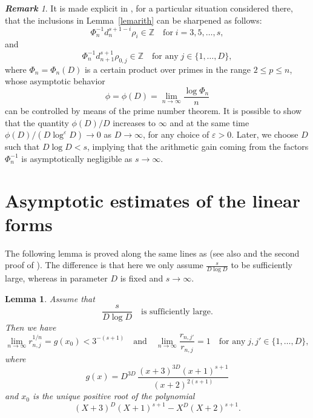 \documentclass{article}
\numberwithin{equation}{section}
\newtheorem{Lem}{Lemma}
\theoremstyle{remark}
\newtheorem{Rem}{\bf Remark}
\newcommand{\Z}{\mathbb{Z}}
\begin{document}
\begin{Rem} \label{remarith}
It is made explicit in \cite{RZnote}, for a particular situation considered there, that the inclusions in Lemma~\ref{lemarith} can be sharpened as follows:
$$\Phi_n^{-1}d_n^{s+1-i} \rho_i \in\Z \quad\mbox{for}\; i = 3, 5, \ldots, s,$$
and
$$\Phi_n^{-1}d_{n+1}^{s+1} \rho_{0,j} \in\Z \quad\mbox{for any}\; j\in \{1,\ldots,D\}, $$
where $\Phi_n=\Phi_n(D)$ is a certain product over primes in the range $2\le p\le n$, whose asymptotic behavior
$$
\phi=\phi(D)=\lim_{n\to\infty}\frac{\log\Phi_n}n
$$
can be controlled by means of the prime number theorem. It is possible to show that the quantity $\phi(D)/D$ increases to $\infty$ and at the same time $\phi(D)/(D\log^\varepsilon D)\to0$ as $D\to\infty$, for any choice of $\varepsilon>0$.
Later, we choose $D$ such that $ D\log D <s $, implying that the arithmetic gain coming from the factors $\Phi_n^{-1}$ is asymptotically negligible as $s\to\infty$.
\end{Rem}


\section{Asymptotic estimates of the linear forms}\label{sec4}


The following lemma is proved along the same lines as \cite[Lemma~2.1]{Sprang} (see also \cite[Lemma~4]{Zudilintrick} and the second proof of \cite[Lemme 3]{BR}). The  difference is that here we only assume $\frac{s}{  D\log D} $ to be sufficiently large, whereas in \cite{Sprang} parameter $D$ is fixed and $ s\to\infty$. 

\begin{Lem} \label{lemasy}
Assume that 
\begin{equation} \label{eqhyp}
\frac{s}{  D\log D} \quad\mbox{is sufficiently large.} 
\end{equation}
Then we have
\begin{equation} \label{eqasyun}
\lim_{n\to\infty} r_{n,j}^{1/n} = g(x_0) <3^{-(s+1)} \quad\mbox{and}\quad \lim_{n\to\infty} \frac{r_{n,j'}}{r_{n,j}} = 1
\quad\mbox{for any}\; j,j'\in\{1,\ldots,D\},
\end{equation}
where
$$g(x) = D^{ 3D } \, \frac{ (x+3)^{3D} (x+1)^{ s+1 }}{ ( x+2)^{2(s+1)}}$$
and $x_0$ is the unique positive root of the polynomial 
$$(X+3)^D(X+1)^{s+1} - X^D (X+2)^{s+1}.$$ 
\end{Lem}

\bigskip
\end{document}
